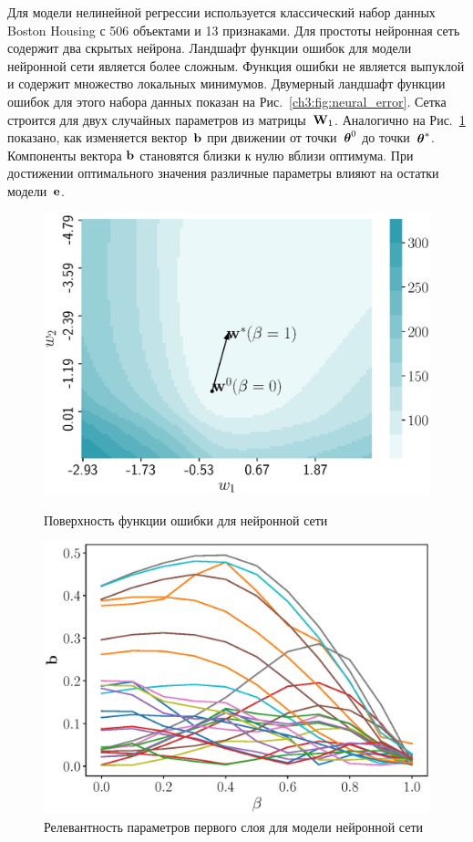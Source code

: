Для модели нелинейной регрессии используется классический набор данных Boston Housing с 506 объектами и 13 признаками.
Для простоты нейронная сеть содержит два скрытых нейрона.
Ландшафт функции ошибок для модели нейронной сети является более сложным. 
Функция ошибки не является выпуклой и содержит множество локальных минимумов.
Двумерный ландшафт функции ошибок для этого набора данных показан на Рис.~\ref{ch3:fig:neural_error}. 
Сетка строится для двух случайных параметров из матрицы~$\mathbf{W}_1$.
Аналогично на Рис.~\ref{ch3:fig:neural_b_wrt_beta} показано, как изменяется вектор~$\mathbf{b}$ при движении от точки~$\boldsymbol{\theta}^0$ до точки~$\boldsymbol{\theta}^*$. 
Компоненты вектора $\mathbf{b}$ становятся близки к нулю вблизи оптимума. 
При достижении оптимального значения различные параметры влияют на остатки модели~$\mathbf{e}$.
\begin{figure}[h]
	\centering
	\begin{minipage}{.5\textwidth}
		\centering
		\includegraphics[width=\linewidth]{figs/ch3/neural_error}
		\caption{Поверхность функции ошибки для нейронной сети}
		\label{ch3:fig:neural_error}
	\end{minipage}%
	\begin{minipage}{.5\textwidth}
		\centering
		\includegraphics[width=\linewidth]{figs/ch3/neural_b_wrt_beta}
		\caption{Релевантность параметров первого слоя для модели нейронной сети}
		\label{ch3:fig:neural_b_wrt_beta}
	\end{minipage}
\end{figure}

